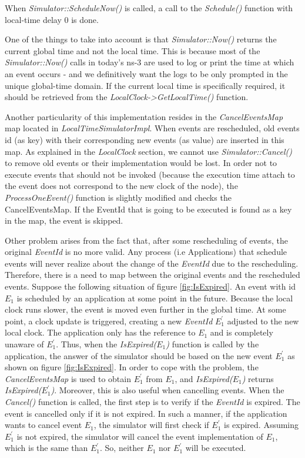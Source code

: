 \documentclass[times, twoside, watermark]{zHenriquesLab-StyleBioRxiv}
\begin{document}
When \textit{Simulator::ScheduleNow()} is called, a call to the \textit{Schedule()} function with local-time delay 0 is done.

One of the things to take into account is that \textit{Simulator::Now()}  returns the current global time and not the local time. This is because most of the \textit{Simulator::Now()} calls in today's ns-3 are used to log or print the time at which an event occurs - and we definitively want the logs to be only prompted in the unique global-time domain. If the current local time is specifically required, it should be retrieved from the \textit{LocalClock->GetLocalTime()} function.

Another particularity of this implementation resides in the \textit{CancelEventsMap} map located in \textit{LocalTimeSimulatorImpl}. When events are rescheduled, old events id (as key) with their corresponding new events (as value) are inserted in this map. As explained in the \textit{LocalClock} section, we cannot use  \textit{Simulator::Cancel()} to remove old events or their implementation would be lost.
In order not to execute events that should not be invoked (because the execution time attach to the event does not correspond to the new clock of
the node), the \textit{ProcessOneEvent()} function is slightly modified and checks the CancelEventsMap. If the EventId that is going to be executed is found as a key in the map, the event is skipped.

Other problem arises from the fact that, after some rescheduling of events, the original \textit{EventId} is no more valid. Any process (i.e Applications) that schedule events will never realize about the change of the \textit{EventId} due to the rescheduling. Therefore, there is a need to map between the original events and the rescheduled events. Suppose the following situation of figure \ref{fig:IsExpired}. An event with id \(E_{1}\) is scheduled by an application at some point in the future. Because the local clock runs slower, the event is moved even further in the global time. At some point, a clock update is triggered, creating a new \textit{EventId} \(E^{'}_{1}\) adjusted to the new local clock. The application only has the reference to \(E_{1}\) and is completely unaware of \(E^{'}_{1}\). Thus, when the \textit{IsExpired(\(E_{1}\))} function is called by the application, the answer of the simulator should be based on the new event \(E^{'}_{1}\) as shown on figure \ref{fig:IsExpired}. In order to cope with the problem, the \textit{CancelEventsMap} is used to obtain \(E^{'}_{1}\) from \(E_{1}\), and \textit{IsExpired(\(E_{1}\))} returns  \textit{IsExpired(\(E^{'}_{1}\))}. Moreover, this is also useful when cancelling events. When the \textit{Cancel()} function is called, the first step is to verify if the \textit{EventId} is expired. The event is cancelled only if it is not expired. In such a manner, if the application wants to cancel event \(E_{1}\), the simulator will first check if \(E^{'}_{1}\) is expired. Assuming \(E^{'}_{1}\) is not expired, the simulator will cancel the event implementation of \(E_{1}\), which is the same than \(E^{'}_{1}\). So, neither \(E_{1}\) nor \(E^{'}_{1}\) will be executed. 
\end{document}
